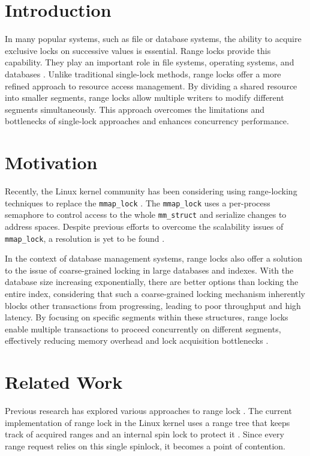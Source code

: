 \section{Introduction}

In many popular systems, such as file or database systems, the ability to acquire exclusive locks on successive values is essential. Range locks provide this capability. They play an important role in file systems, operating systems, and databases \parencite{readerWriterLocks2017, graefe2007hierarchical, lee2021concurrent}. Unlike traditional single-lock methods, range locks offer a more refined approach to resource access management. By dividing a shared resource into smaller segments, range locks allow multiple writers to modify different segments simultaneously. This approach overcomes the limitations and bottlenecks of single-lock approaches and enhances concurrency performance.

\section{Motivation}
Recently, the Linux kernel community has been considering using range-locking techniques to replace the \texttt{mmap\_lock} \parencite{readerWriterLocks2017, mapleTree2021, mmapLock2022}. The \texttt{mmap\_lock} uses a per-process semaphore to control access to the whole \texttt{mm\_struct} \parencite{mmstruct2023} and serialize changes to address spaces.  Despite previous efforts to overcome the scalability issues of \texttt{mmap\_lock}, a resolution is yet to be found \parencite{mmapLock2022}.

In the context of database management systems, range locks also offer a solution to the issue of coarse-grained locking in large databases and indexes. With the database size increasing exponentially, there are better options than locking the entire index, considering that such a coarse-grained locking mechanism inherently blocks other transactions from progressing, leading to poor throughput and high latency. By focusing on specific segments within these structures, range locks enable multiple transactions to proceed concurrently on different segments, effectively reducing memory overhead and lock acquisition bottlenecks \parencite{graefe2007hierarchical}.

\section{Related Work}
Previous research has explored various approaches to range lock \parencite{linuxRangeLockImpl2013, song2013parallelizing, kogan2020scalable}. The current implementation of range lock in the Linux kernel uses a range tree that keeps track of acquired ranges and an internal spin lock to protect it \parencite{linuxRangeLockImpl2013}. Since every range request relies on this single spinlock, it becomes a point of contention. 


